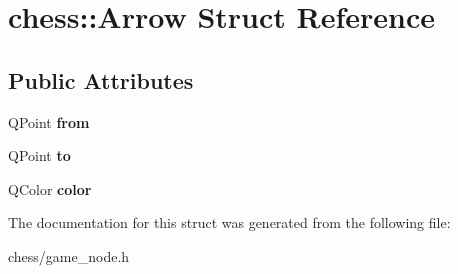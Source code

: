 \hypertarget{structchess_1_1Arrow}{\section{chess\-:\-:Arrow Struct Reference}
\label{structchess_1_1Arrow}
}
\subsection*{Public Attributes}
\begin{DoxyCompactItemize}
\item 
\hypertarget{structchess_1_1Arrow_a9c5c8fb47db6240ad6b01710ec1873da}{Q\-Point {\bfseries from}}\label{structchess_1_1Arrow_a9c5c8fb47db6240ad6b01710ec1873da}

\item 
\hypertarget{structchess_1_1Arrow_af3b8609feced53ef66d76c273d7f0673}{Q\-Point {\bfseries to}}\label{structchess_1_1Arrow_af3b8609feced53ef66d76c273d7f0673}

\item 
\hypertarget{structchess_1_1Arrow_a0540c3642df83a29b0a85712f94ac878}{Q\-Color {\bfseries color}}\label{structchess_1_1Arrow_a0540c3642df83a29b0a85712f94ac878}

\end{DoxyCompactItemize}


The documentation for this struct was generated from the following file\-:\begin{DoxyCompactItemize}
\item 
chess/game\-\_\-node.\-h\end{DoxyCompactItemize}
